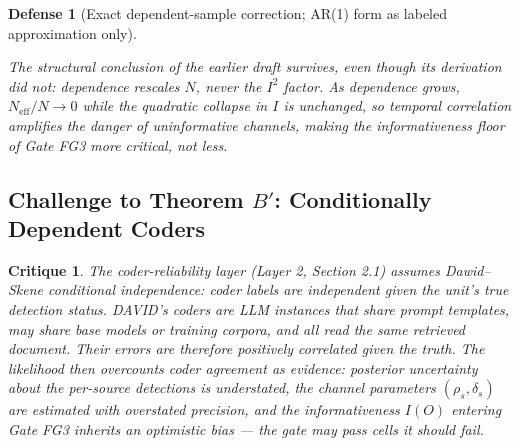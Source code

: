 \documentclass[11pt,a4paper]{article}
\newtheorem{critique}{Critique}
\newtheorem{defense}{Defense}
\begin{document}
\begin{defense}[Exact dependent-sample correction; AR(1) form as labeled approximation only]
\begin{enumerate}
\end{enumerate}
The structural conclusion of the earlier draft survives, even though its derivation did not: dependence rescales $N$, never the $I^2$ factor. As dependence grows, $N_{\mathrm{eff}}/N \to 0$ while the quadratic collapse in $I$ is unchanged, so temporal correlation \emph{amplifies} the danger of uninformative channels, making the informativeness floor of Gate FG3 more critical, not less. %
\end{defense}

\subsection{Challenge to Theorem $B'$: Conditionally Dependent Coders}
\begin{critique}
The coder-reliability layer (Layer 2, Section 2.1) assumes Dawid--Skene conditional independence: coder labels are independent given the unit's true detection status. DAVID's coders are LLM instances that share prompt templates, may share base models or training corpora, and all read the \emph{same} retrieved document. Their errors are therefore positively correlated given the truth. The likelihood then overcounts coder agreement as evidence: posterior uncertainty about the per-source detections is understated, the channel parameters $(\rho_s, \delta_s)$ are estimated with overstated precision, and the informativeness $I(O)$ entering Gate FG3 inherits an optimistic bias --- the gate may pass cells it should fail. %
\end{critique}
\end{document}

